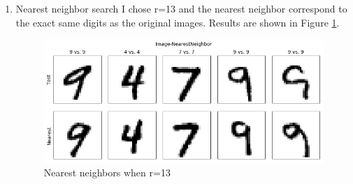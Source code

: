 \documentclass{article}
\begin{document}
\begin{enumerate}
\begin{enumerate}
\begin{verbatim}
def NMF(input_data, r=3, n_iters=10):
    X = input_data.copy()
    N, p = input_data.shape
    # Initialize W and H
    W = np.ones((N, r), dtype=np.float64)
    H = np.ones((r, p), dtype=np.float64)
    for _ in range(n_iters):
        # Update rows of W
        for k in range(r):
            H_rsum = np.sum(H[k,:])
            WH = np.dot(W,H)
            WH[np.where(WH==0)] +=0.001
            if(H_rsum!=0):
                W[:, k] = W[:, k] * np.sum(H[k,:]*(X/WH),1)/ H_rsum
        for k in range(r):
            W_rsum = np.sum(W[:,k])
            WH = np.dot(W,H)
            WH[np.where(WH==0)] +=0.001 
            if(W_rsum!=0.0):
                H[k, :] = H[k, :] * np.sum(W[:, k].reshape(N,1)*(X/WH),0)/W_rsum    
    return H
\end{verbatim}
The results are shown in Figure \ref{fig_r3}, \ref{fig_r6} and \ref{fig_r10}.
\pagebreak

\item Nearest neighbor search
I chose r=13 and the nearest neighbor correspond to the exact same digits as the original images. Results are shown in Figure \ref{fig_nb}.
\begin{figure}[ht]
\includegraphics[width=\textwidth]{../plots/2b.png}
\caption{Nearest neighbors when r=13}
\label{fig_nb}
\end{figure}



\end{enumerate}
\end{enumerate}
\end{document}
